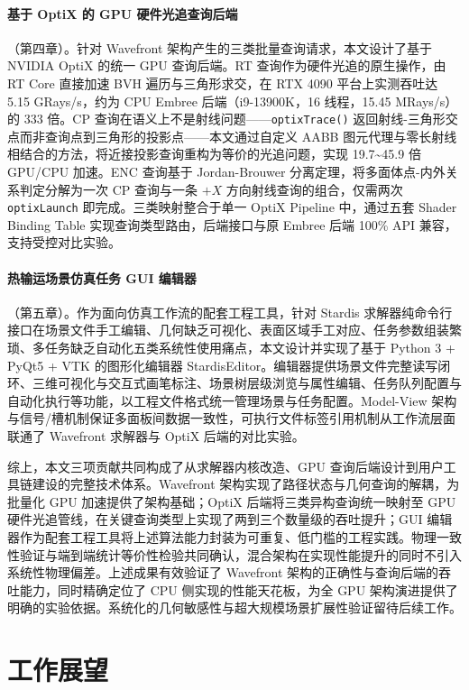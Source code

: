 \paragraph{ 基于 OptiX 的 GPU 硬件光追查询后端}（第四章）。针对 Wavefront 架构产生的三类批量查询请求，本文设计了基于 NVIDIA OptiX 的统一 GPU 查询后端。RT 查询作为硬件光追的原生操作，由 RT Core 直接加速 BVH 遍历与三角形求交，在 RTX 4090 平台上实测吞吐达 5.15 GRays/s，约为 CPU Embree 后端（i9-13900K，16 线程，15.45 MRays/s）的 333 倍。CP 查询在语义上不是射线问题——\texttt{optixTrace()} 返回射线-三角形交点而非查询点到三角形的投影点——本文通过自定义 AABB 图元代理与零长射线相结合的方法，将近接投影查询重构为等价的光追问题，实现 19.7\textasciitilde 45.9 倍 GPU/CPU 加速。ENC 查询基于 Jordan-Brouwer 分离定理，将多面体点-内外关系判定分解为一次 CP 查询与一条 $+X$ 方向射线查询的组合，仅需两次 \texttt{optixLaunch} 即完成。三类映射整合于单一 OptiX Pipeline 中，通过五套 Shader Binding Table 实现查询类型路由，后端接口与原 Embree 后端 100\% API 兼容，支持受控对比实验。

\paragraph{ 热输运场景仿真任务 GUI 编辑器}（第五章）。作为面向仿真工作流的配套工程工具，针对 Stardis 求解器纯命令行接口在场景文件手工编辑、几何缺乏可视化、表面区域手工对应、任务参数组装繁琐、多任务缺乏自动化五类系统性使用痛点，本文设计并实现了基于 Python 3 + PyQt5 + VTK 的图形化编辑器 StardisEditor。编辑器提供场景文件完整读写闭环、三维可视化与交互式画笔标注、场景树层级浏览与属性编辑、任务队列配置与自动化执行等功能，以工程文件格式统一管理场景与任务配置。Model-View 架构与信号/槽机制保证多面板间数据一致性，可执行文件标签引用机制从工作流层面联通了 Wavefront 求解器与 OptiX 后端的对比实验。

综上，本文三项贡献共同构成了从求解器内核改造、GPU 查询后端设计到用户工具链建设的完整技术体系。Wavefront 架构实现了路径状态与几何查询的解耦，为批量化 GPU 加速提供了架构基础；OptiX 后端将三类异构查询统一映射至 GPU 硬件光追管线，在关键查询类型上实现了两到三个数量级的吞吐提升；GUI 编辑器作为配套工程工具将上述算法能力封装为可重复、低门槛的工程实践。物理一致性验证与端到端统计等价性检验共同确认，混合架构在实现性能提升的同时不引入系统性物理偏差。上述成果有效验证了 Wavefront 架构的正确性与查询后端的吞吐能力，同时精确定位了 CPU 侧实现的性能天花板，为全 GPU 架构演进提供了明确的实验依据。系统化的几何敏感性与超大规模场景扩展性验证留待后续工作。

\section{工作展望}

